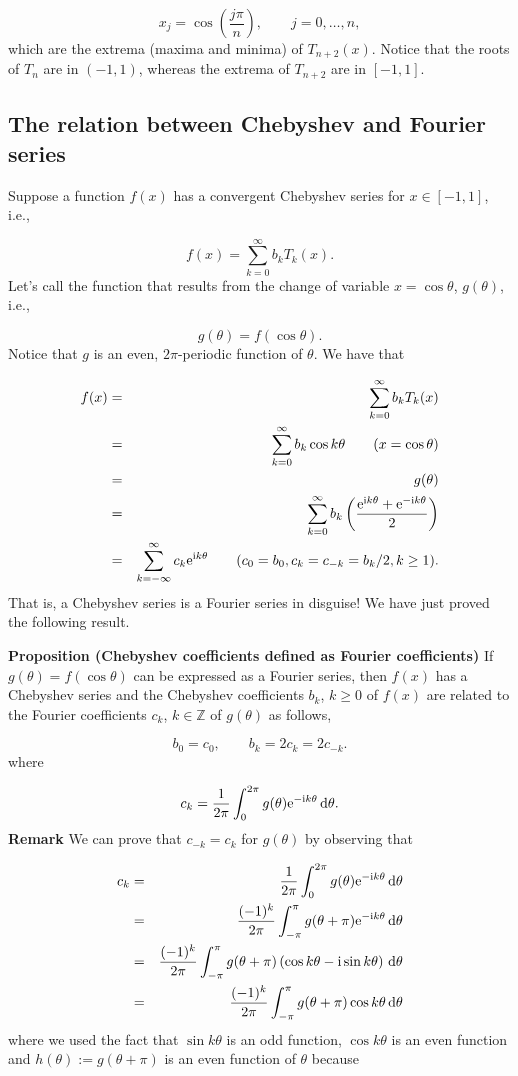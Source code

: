 \documentclass[12pt,a4paper]{article}
\begin{document}
\[
x_j = \cos\left(\frac{j\pi}{n}\right), \qquad j = 0, \ldots, n, 
\]
which are the extrema (maxima and minima) of $T_{n+2}(x)$.  Notice that the roots of $T_n$ are in $(-1, 1)$, whereas the extrema of $T_{n+2}$ are in $[-1, 1]$.

\subsection{The relation between Chebyshev and Fourier series}
Suppose a function $f(x)$ has a convergent Chebyshev series for $x \in [-1, 1]$, i.e.,

\[
f(x) = \sum_{k=0}^{\infty} b_k T_k(x).
\]
Let's call the function that results from the change of variable $x = \cos \theta$, $g(\theta)$, i.e.,

\[
g(\theta) = f(\cos \theta).
\]
Notice that $g$ is an even, $2\pi$-periodic function of $\theta$.  We have that


\begin{eqnarray*}
f(x) &=& \sum_{k=0}^{\infty} b_k T_k(x) \\
  &=& \sum_{k=0}^{\infty} b_k\cos k\theta   \qquad (x = \cos \theta)  \\
  & = & g(\theta) \\
  &=& \sum_{k=0}^{\infty} b_k\left(\frac{{\rm e}^{{\rm i}k\theta} + {\rm e}^{-{\rm i}k\theta}}{2}   \right) \\
  &=& \sum_{k=-\infty}^{\infty} c_k {\rm e}^{{\rm i}k\theta}  \qquad (c_0 = b_0, c_{k} = c_{-k} = b_k/2, k\geq 1).
\end{eqnarray*}
That is, a Chebyshev series is a Fourier series in disguise! We have just proved the following result.

\textbf{Proposition (Chebyshev coefficients defined as Fourier coefficients)} If $g(\theta) = f(\cos \theta)$ can be expressed as a Fourier series, then $f(x)$ has a Chebyshev series and the Chebyshev coefficients $b_k$, $k \geq 0$ of $f(x)$ are related to the Fourier coefficients $c_k$, $k \in \mathbb{Z}$  of $g(\theta)$ as follows,

\[
b_0 = c_0, \qquad b_k = 2c_k = 2c_{-k}.
\]
where

\[
c_k = \frac{1}{2\pi}\int_{0}^{2\pi}g(\theta){\rm e}^{-{\rm i}k\theta}\,{\rm d}\theta.
\]
\textbf{Remark} We can prove that $c_{-k} = c_{k}$ for $g(\theta)$ by observing that 


\begin{eqnarray*}
c_k &=& \frac{1}{2\pi} \int_{0}^{2\pi} g(\theta){\rm e}^{-{\rm i}k\theta}\,{\rm d}\theta \\
    &=& \frac{(-1)^{k}}{2\pi} \int_{-\pi}^{\pi} g(\theta +\pi){\rm e}^{-{\rm i}k\theta}\,{\rm d}\theta \\
    &=& \frac{(-1)^{k}}{2\pi} \int_{-\pi}^{\pi} g(\theta +\pi)\left(\cos k\theta - {\rm i} \sin k\theta   \right)\,{\rm d}\theta \\
    &=& \frac{(-1)^{k}}{2\pi} \int_{-\pi}^{\pi} g(\theta +\pi) \cos k\theta \,{\rm d}\theta
\end{eqnarray*}
where we used the fact that $\sin k \theta$ is an odd function, $\cos k \theta$ is an even function and $h(\theta) := g(\theta + \pi) $ is an even function of $\theta$ because
\end{document}
